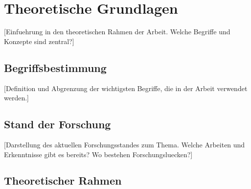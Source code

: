 

\chapter{Theoretische Grundlagen}
\label{chap:theoretische-grundlagen}


[Einfuehrung in den theoretischen Rahmen der Arbeit. Welche Begriffe
und Konzepte sind zentral?]


\section{Begriffsbestimmung}
\label{sec:begriffe}

[Definition und Abgrenzung der wichtigsten Begriffe, die in der Arbeit
verwendet werden.]



\section{Stand der Forschung}
\label{sec:forschungsstand}

[Darstellung des aktuellen Forschungsstandes zum Thema. Welche
Arbeiten und Erkenntnisse gibt es bereits? Wo bestehen Forschungsluecken?]



\section{Theoretischer Rahmen}
\label{sec:theorie}

